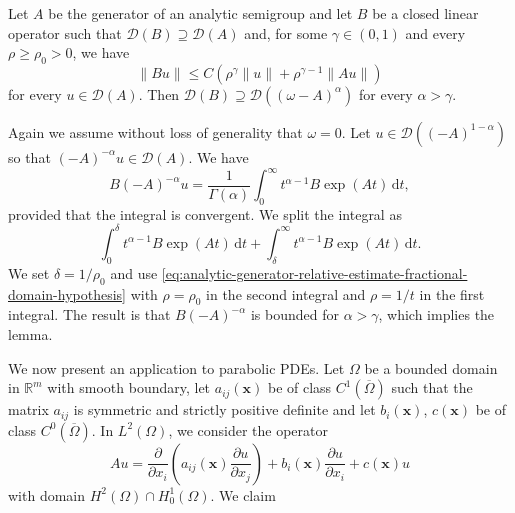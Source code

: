 \begin{Lemma}
\label{lem:analytic-relative-estimate-implies-fractional-domain}
Let $A$ be the generator of an analytic semigroup and let $B$ be a closed linear operator such that $\mathcal{D}(B)\supseteq\mathcal{D}(A)$ and, for some $\gamma\in(0,1)$ and every $\rho\geq\rho_0>0$, we have
\begin{equation}\label{eq:analytic-generator-relative-estimate-fractional-domain-hypothesis}
\|Bu\|\leq C(\rho^\gamma\|u\|+\rho^{\gamma-1}\|Au\|)
\end{equation}
for every $u\in\mathcal{D}(A)$. Then $\mathcal{D}(B)\supseteq\mathcal{D}((\omega-A)^\alpha)$ for every $\alpha>\gamma$.
\end{Lemma}

\begin{Proof}
Again we assume without loss of generality that $\omega=0$. Let $u\in\mathcal{D}((-A)^{1-\alpha})$ so that $(-A)^{-\alpha}u\in\mathcal{D}(A)$. We have
\begin{equation}\label{eq:analytic-generator-fractional-domain-converse-integral}
B(-A)^{-\alpha}u=\dfrac{1}{\Gamma(\alpha)}\int_0^\infty t^{\alpha-1}B\exp(At)\,\mathrm{d}t,
\end{equation}
provided that the integral is convergent. We split the integral as
\begin{equation}\label{eq:analytic-generator-fractional-domain-converse-integral-split}
\int_0^\delta t^{\alpha-1}B\exp(At)\,\mathrm{d}t+\int_\delta^\infty t^{\alpha-1}B\exp(At)\,\mathrm{d}t.
\end{equation}
We set $\delta=1/\rho_0$ and use \eqref{eq:analytic-generator-relative-estimate-fractional-domain-hypothesis} with $\rho=\rho_0$ in the second integral and $\rho=1/t$ in the first integral. The result is that $B(-A)^{-\alpha}$ is bounded for $\alpha>\gamma$, which implies the lemma.
\end{Proof}

We now present an application to parabolic PDEs. Let $\Omega$ be a bounded domain in $\mathbb{R}^m$ with smooth boundary, let $a_{ij}(\bm{x})$ be of class $C^1(\overline\Omega)$ such that the matrix $a_{ij}$ is symmetric and strictly positive definite and let $b_i(\bm{x})$, $c(\bm{x})$ be of class $C^0(\overline\Omega)$. In $L^2(\Omega)$, we consider the operator
\begin{equation}\label{eq:analytic-semigroup-elliptic-dirichlet-generator}
Au=\dfrac{\partial}{\partial x_i}\left(a_{ij}(\bm{x})\dfrac{\partial u}{\partial x_j}\right)+b_i(\bm{x})\dfrac{\partial u}{\partial x_i}+c(\bm{x})u
\end{equation}
with domain $H^2(\Omega)\cap H_0^1(\Omega)$. We claim


